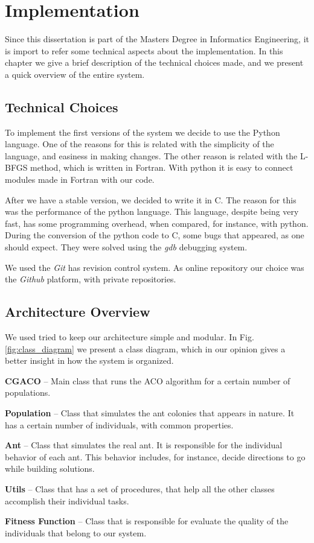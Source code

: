 \chapter{Implementation}

Since this dissertation is part of the Masters Degree in Informatics Engineering, it is import to refer some technical aspects about the implementation. In this chapter we give a brief description of the technical choices made, and we present a quick overview of the entire system.

\section{Technical Choices}

To implement the first versions of the system we decide to use the Python language. One of the reasons for this is related with the simplicity of the language, and easiness in making changes. The other reason is related with the L-BFGS method, which is written in Fortran. With python it is easy to connect modules made in Fortran with our code.

After we have a stable version, we decided to write it in C. The reason for this was the performance of the python language. This language, despite being very fast, has some programming overhead, when compared, for instance, with python. During the conversion of the python code to C, some bugs that appeared, as one should expect. They were solved using the \emph{gdb} debugging system.

We used the \emph{Git} has revision control system. As online repository our choice was the \emph{Github} platform, with private repositories.

\section{Architecture Overview}
We used tried to keep our architecture simple and modular. In Fig.\ref{fig:class_diagram} we present a class diagram, which in our opinion gives a better insight in how the system is organized.

\pagebreak
\textbf{CGACO} – Main class that runs the ACO algorithm for a certain number of populations.

\textbf{Population} – Class that simulates the ant colonies that appears in nature. It has a certain number of individuals, with common properties.

\textbf{Ant} – Class that simulates the real ant. It is responsible for the individual behavior of each ant. This behavior includes, for instance, decide directions to go while building solutions.

\textbf{Utils} – Class that has a set of procedures, that help all the other classes accomplish their individual tasks.

\textbf{Fitness Function} – Class that is responsible for evaluate the quality of the individuals that belong to our system.

